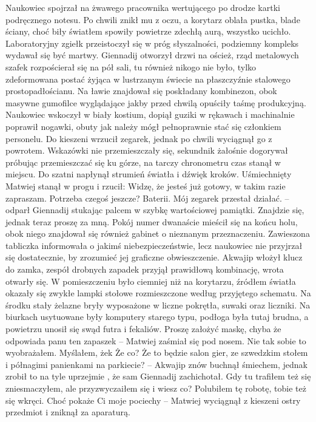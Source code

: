 \documentclass[../MAIN.tex]{subfiles}
\begin{document}
\qd
Naukowiec spojrzał na żwawego pracownika wertującego po drodze kartki podręcznego notesu. Po chwili znikł mu z oczu, a korytarz oblała pustka, blade ściany, choć biły światłem spowiły powietrze zdechłą aurą, wszystko ucichło. Laboratoryjny zgiełk przeistoczył się w próg słyszalności, podziemny kompleks wydawał się być martwy. Giennadij otworzył drzwi na oścież, rząd metalowych szafek rozpościerał się na pół sali, tu również nikogo nie było, tylko zdeformowana postać żyjąca w lustrzanym świecie na płaszczyźnie stalowego prostopadłościanu. Na ławie znajdował się poskładany kombinezon, obok masywne gumofilce wyglądające jakby przed chwilą opuściły taśmę produkcyjną. Naukowiec wskoczył w biały kostium, dopiął guziki w rękawach i machinalnie poprawił nogawki, obuty jak należy mógł pełnoprawnie stać się członkiem personelu. Do kieszeni wrzucił zegarek, jednak po chwili wyciągnął go z powrotem. Wskazówki nie przemieszczały się, sekundnik żałośnie dogorywał próbując przemieszczać się ku górze, na tarczy chronometru 
czas stanął w miejscu. Do szatni napłynął strumień światła i dźwięk kroków. Uśmiechnięty Matwiej stanął w progu i rzucił: 
% 
\sx Widzę, że jesteś już gotowy, w takim razie zapraszam. Potrzeba czegoś jeszcze? 
\xx Baterii. Mój zegarek przestał działać. -- odparł Giennadij stukając palcem w szybkę wartościowej pamiątki. 
\xx Znajdzie się, jednak teraz proszę za mną. 
\qd
Pokój numer dwanaście mieścił się na końcu holu, obok niego znajdował się również gabinet o nieznanym przeznaczeniu. Zawieszona tabliczka informowała o jakimś niebezpieczeństwie, lecz naukowiec nie przyjrzał się dostatecznie, by zrozumieć jej graficzne obwieszczenie. Akwajip włożył klucz do zamka, zespół drobnych zapadek przyjął prawidłową kombinację, wrota otwarły się. W pomieszczeniu było ciemniej niż na korytarzu, źródłem światła okazały się zwykłe lampki stołowe rozmieszczone według przyjętego schematu. Na środku stały żelazne bryły wyposażone w liczne pokrętła, suwaki oraz liczniki. Na biurkach usytuowane były komputery starego typu, podłoga była tutaj brudna, a powietrzu unosił się swąd futra i fekaliów. 
% 
\sx Proszę założyć maskę, chyba że odpowiada panu ten zapaszek -- Matwiej zaśmiał się pod nosem. 
\xx Nie tak sobie to wyobrażałem. Myślałem, że\3k 
\xx Że co? Że to będzie salon gier, ze szwedzkim stołem i półnagimi panienkami na parkiecie? -- Akwajip znów buchnął śmiechem, jednak zrobił to na tyle uprzejmie , że sam Giennadij zachichotał. 
\xx Gdy tu trafiłem też się zniesmaczyłem, ale przyzwyczaiłem się i wiesz co? Polubiłem tę robotę, tobie też się wkręci. Choć pokaże Ci moje pociechy -- Matwiej wyciągnął z kieszeni ostry przedmiot i zniknął za aparaturą. 
\end{document}
